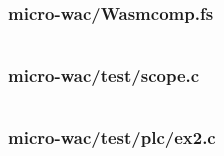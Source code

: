 \documentclass[a4paper]{article}
\begin{document}
\newpage
\subsubsection{micro-wac/Wasmcomp.fs}
\label{sec:appendix:code:Wasmcomp.fs}
\inputminted[breaklines,tabsize=2,linenos]{fsharp}{../micro-wac/Wasmcomp.fs}

\newpage
\subsubsection{micro-wac/test/scope.c}
\label{sec:appendix:code:test-scope.c}
\inputminted[breaklines,tabsize=2,linenos]{c}{../micro-wac/test/scope.c}

\newpage
\subsubsection{micro-wac/test/plc/ex2.c}
\label{sec:appendix:code:plc-ex2.c}
\inputminted[breaklines,tabsize=2,linenos]{c}{../micro-wac/test/plc/ex2.c}
\end{document}
